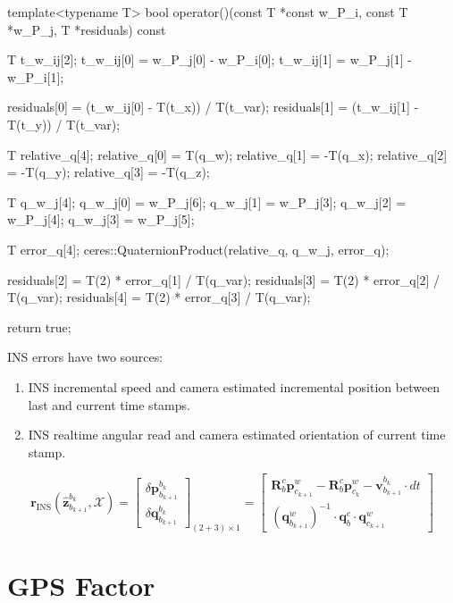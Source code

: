 \documentclass[12pt]{report}   %
\begin{document}
\begin{cppcode}
 
template<typename T>
bool operator()(const T *const w_P_i, const T *w_P_j, T *residuals) const {
	T t_w_ij[2];
	t_w_ij[0] = w_P_j[0] - w_P_i[0];
	t_w_ij[1] = w_P_j[1] - w_P_i[1];
	
	residuals[0] = (t_w_ij[0] - T(t_x)) / T(t_var);
	residuals[1] = (t_w_ij[1] - T(t_y)) / T(t_var);
	
	T relative_q[4];
	relative_q[0] = T(q_w);
	relative_q[1] = -T(q_x);
	relative_q[2] = -T(q_y);
	relative_q[3] = -T(q_z);
	
	T q_w_j[4];
	q_w_j[0] = w_P_j[6];
	q_w_j[1] = w_P_j[3];
	q_w_j[2] = w_P_j[4];
	q_w_j[3] = w_P_j[5];
	
	T error_q[4];
	ceres::QuaternionProduct(relative_q, q_w_j, error_q);
	
	residuals[2] = T(2) * error_q[1] / T(q_var);
	residuals[3] = T(2) * error_q[2] / T(q_var);
	residuals[4] = T(2) * error_q[3] / T(q_var);
	
	return true;
}
\end{cppcode}

INS errors have two sources:

\begin{enumerate}
	\item INS incremental speed and camera estimated incremental position between last and current time stamps.
	
	\item INS realtime angular read and camera estimated orientation of current time stamp.
\end{enumerate}

\begin{equation}
\label{equ:residual_ins}
\mathbf{r}_{\mathrm{INS}}\left(\hat{\mathbf{z}}_{b_{k+1}}^{b_{k}}, \mathcal{X}\right) 
=
\left[\begin{array}{c}
{\delta \boldsymbol{p}_{b_{k+1}}^{b_{k}}} \\ 
{\delta \boldsymbol{q}_{b_{k+1}}^{b_{k}}}
\end{array}\right]_{(2+3) \times 1} 
= \left[\begin{array}{c}
{\bm{R}_b^c\bm{p}_{c_{k+1}}^w - \bm{R}_b^c\bm{p}_{c_{k}}^w - \bm{v}_{b_{k+1}}^{b_k} \cdot dt} \\
{\left(\bm{q}_{b_{k+1}}^w \right)^{-1} \cdot \bm{q}_b^c \cdot \bm{q}_{c_{k+1}}^w}
\end{array}\right]
\end{equation}


\section{GPS Factor}
\end{document}
